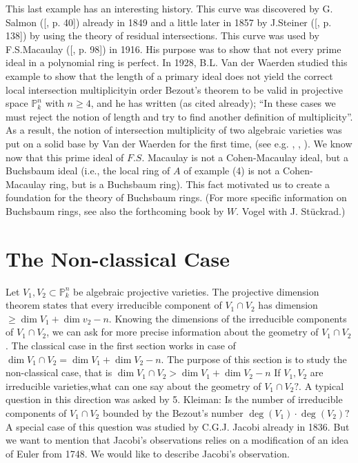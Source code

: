 \setcounter{remark}{10}
\begin{remark}\label{chap0:sec1:rem0.11}
 This last example has an interesting history. This curve was discovered
 by G. Salmon ([\cite{67}, p. 40]) already in 1849 and a little later in
 1857 by J.Steiner ([\cite{79}, p. 138]) by using the theory of residual
 intersections. This curve was used by F.S.Macaulay ([\cite{49}, p. 98]) in
 1916. His purpose was to show that not every prime ideal in a
 polynomial ring is perfect. In 1928, B.L. Van der Waerden \cite{90}
 studied this example to show that the length of a primary ideal does
 not yield the correct local intersection 
multiplicity\pageoriginale in order Bezout's theorem to be valid in projective space
$ \mathds{P}^n_k$ with $n \geq 4$, and he has written (as cited
already); ``In these cases we must reject the notion of length and try
to find another definition of multiplicity''. As a result, the notion
of intersection multiplicity of two algebraic varieties was put on a
solid base by Van der Waerden for the first time, (see
e.g. \cite{88}, \cite{91}, \cite{92}). We know now that this prime ideal of
$F.S$. Macaulay is not a Cohen-Macaulay ideal, but a Buchsbaum ideal
(i.e., the local ring of $A$ of example (4) is not a Cohen-Macaulay
ring, but is a Buchsbaum ring). This fact motivated us to create a
foundation for the theory of Buchsbaum rings. (For more specific
information on Buchsbaum rings, see also the forthcoming book by
$W$. Vogel with J. St\"uckrad.) 
\end{remark}

\section{The Non-classical Case}\label{chap0:sec2} 

Let $V_1, V_2 \subset  \mathbb{P}^n_k$ be algebraic projective
varieties. The projective dimension theorem states that every
irreducible component of $V_1\cap V_2$ has dimension $\geq \dim
V_1+\dim v_2-n$. Knowing the dimensions of the irreducible components
of $V_1\cap V_2$, we can ask for more precise information about the
geometry of $V_1\cap V_2$. The classical case in the first section
works in case of $\dim V_1\cap V_2 = \dim V_1 +\dim V_2-n$. The
purpose of this section is to study the non-classical case, that is
$\dim V_1 \cap V_2>\dim V_1+\dim V_2-n$ If $V_1, V_2$ are irreducible
varieties,\pageoriginale what can one say about the geometry of $V_1\cap V_2 ?$. A
typical question in this direction was asked by 5. Kleiman:  Is the
number of irreducible components of $V_1\cap V_2$ bounded by the
Bezout's number $\deg (V_1)\cdot\deg  (V_2) ?$ A special case of this
question was studied by C.G.J. Jacobi \cite{36} already in 1836. But we
want to mention that Jacobi's observations relies on a modification of
an idea of Euler \cite{16} from 1748. We would like to describe
Jacobi's observation. 

